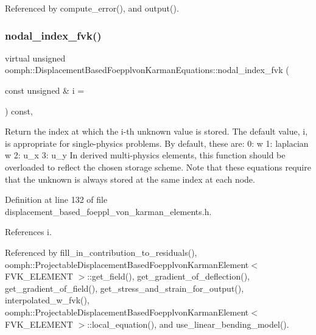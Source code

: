Referenced by compute\+\_\+error(), and output().

\mbox{\label{classoomph_1_1DisplacementBasedFoepplvonKarmanEquations_a85e8c68577eb3c8528269db180d8db84}} 
\subsubsection{\texorpdfstring{nodal\+\_\+index\+\_\+fvk()}{nodal\_index\_fvk()}}
{\footnotesize\ttfamily virtual unsigned oomph\+::\+Displacement\+Based\+Foepplvon\+Karman\+Equations\+::nodal\+\_\+index\+\_\+fvk (\begin{DoxyParamCaption}\item[{const unsigned \&}]{i = {} }\end{DoxyParamCaption}) const\hspace{0.3cm}{\ttfamily [inline]}, {\ttfamily [virtual]}}



Return the index at which the i-\/th unknown value is stored. The default value, i, is appropriate for single-\/physics problems. By default, these are\+: 0\+: w 1\+: laplacian w 2\+: u\+\_\+x 3\+: u\+\_\+y In derived multi-\/physics elements, this function should be overloaded to reflect the chosen storage scheme. Note that these equations require that the unknown is always stored at the same index at each node. 



Definition at line 132 of file displacement\+\_\+based\+\_\+foeppl\+\_\+von\+\_\+karman\+\_\+elements.\+h.



References i.



Referenced by fill\+\_\+in\+\_\+contribution\+\_\+to\+\_\+residuals(), oomph\+::\+Projectable\+Displacement\+Based\+Foepplvon\+Karman\+Element$<$ F\+V\+K\+\_\+\+E\+L\+E\+M\+E\+N\+T $>$\+::get\+\_\+field(), get\+\_\+gradient\+\_\+of\+\_\+deflection(), get\+\_\+gradient\+\_\+of\+\_\+field(), get\+\_\+stress\+\_\+and\+\_\+strain\+\_\+for\+\_\+output(), interpolated\+\_\+w\+\_\+fvk(), oomph\+::\+Projectable\+Displacement\+Based\+Foepplvon\+Karman\+Element$<$ F\+V\+K\+\_\+\+E\+L\+E\+M\+E\+N\+T $>$\+::local\+\_\+equation(), and use\+\_\+linear\+\_\+bending\+\_\+model().

